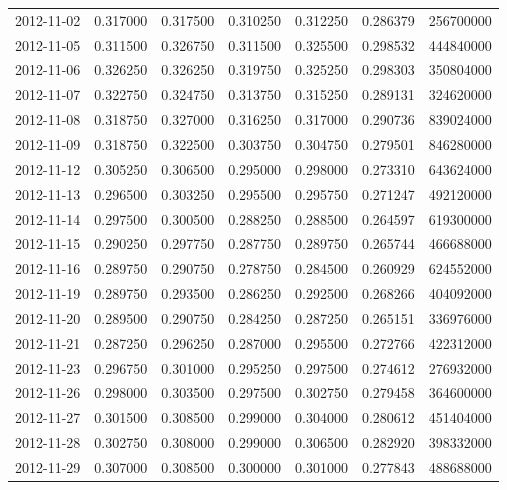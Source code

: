 \begin{tabular}{lrrrrrr}
2012-11-02 &    0.317000 &    0.317500 &    0.310250 &    0.312250 &    0.286379 &   256700000 \\
2012-11-05 &    0.311500 &    0.326750 &    0.311500 &    0.325500 &    0.298532 &   444840000 \\
2012-11-06 &    0.326250 &    0.326250 &    0.319750 &    0.325250 &    0.298303 &   350804000 \\
2012-11-07 &    0.322750 &    0.324750 &    0.313750 &    0.315250 &    0.289131 &   324620000 \\
2012-11-08 &    0.318750 &    0.327000 &    0.316250 &    0.317000 &    0.290736 &   839024000 \\
2012-11-09 &    0.318750 &    0.322500 &    0.303750 &    0.304750 &    0.279501 &   846280000 \\
2012-11-12 &    0.305250 &    0.306500 &    0.295000 &    0.298000 &    0.273310 &   643624000 \\
2012-11-13 &    0.296500 &    0.303250 &    0.295500 &    0.295750 &    0.271247 &   492120000 \\
2012-11-14 &    0.297500 &    0.300500 &    0.288250 &    0.288500 &    0.264597 &   619300000 \\
2012-11-15 &    0.290250 &    0.297750 &    0.287750 &    0.289750 &    0.265744 &   466688000 \\
2012-11-16 &    0.289750 &    0.290750 &    0.278750 &    0.284500 &    0.260929 &   624552000 \\
2012-11-19 &    0.289750 &    0.293500 &    0.286250 &    0.292500 &    0.268266 &   404092000 \\
2012-11-20 &    0.289500 &    0.290750 &    0.284250 &    0.287250 &    0.265151 &   336976000 \\
2012-11-21 &    0.287250 &    0.296250 &    0.287000 &    0.295500 &    0.272766 &   422312000 \\
2012-11-23 &    0.296750 &    0.301000 &    0.295250 &    0.297500 &    0.274612 &   276932000 \\
2012-11-26 &    0.298000 &    0.303500 &    0.297500 &    0.302750 &    0.279458 &   364600000 \\
2012-11-27 &    0.301500 &    0.308500 &    0.299000 &    0.304000 &    0.280612 &   451404000 \\
2012-11-28 &    0.302750 &    0.308000 &    0.299000 &    0.306500 &    0.282920 &   398332000 \\
2012-11-29 &    0.307000 &    0.308500 &    0.300000 &    0.301000 &    0.277843 &   488688000 \\

\end{tabular}
